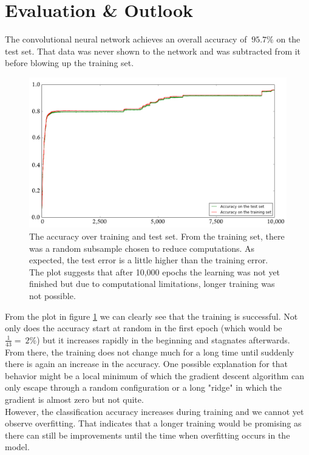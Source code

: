 \documentclass[11pt,a4paper]{article}
\begin{document}
\section{Evaluation \& Outlook}
The convolutional neural network achieves an overall accuracy of $~95.7 \%$ on the test set. That data was never shown to the network and was subtracted from it before blowing up the training set.\\
\begin{figure}[h!]
	\includegraphics[width=\textwidth]{accuracy.png}
	\centering
	\caption[Accuracy]{The accuracy over training and test set. From the training set, there was a random subsample chosen to reduce computations. As expected, the test error is a little higher than the training error.\\
The plot suggests that after 10,000 epochs the learning was not yet finished but due to computational limitations, longer training was not possible.}
	\label{fig:accuracy}
\end{figure}
From the plot in figure \ref{fig:accuracy} we can clearly see that the training is successful. Not only does the accuracy start at random in the first epoch (which would be $\frac{1}{43} = ~2 \%$) but it increases rapidly in the beginning and stagnates afterwards. From there, the training does not change much for a long time until suddenly there is again an increase in the accuracy. One possible explanation for that behavior might be a local minimum of which the gradient descent algorithm can only escape through a random configuration or a long "ridge" in which the gradient is almost zero but not quite.\\
However, the classification accuracy increases during training and we cannot yet observe overfitting. That indicates that a longer training would be promising as there can still be improvements until the time when overfitting occurs in the model.
\end{document}

